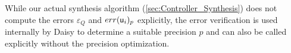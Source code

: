 While our actual synthesis algorithm (\autoref{sec:Controller_Synthesis}) does
not compute the errors $\varepsilon_Q$ and $err(\mathsf u_{{i}})_{p}$ explicitly, the
error verification is used internally by Daisy to determine a suitable precision
$p$ and can also be called explicitly without the precision optimization.



